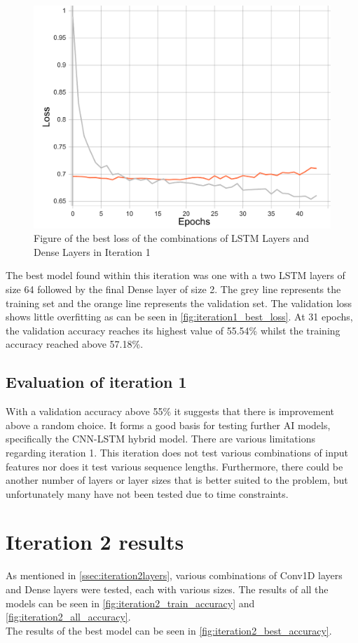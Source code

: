 \begin{figure}[ht]
    \centering
    \includegraphics[width=0.95\columnwidth]{figures/results/lstm/lstm_2L64-2D32_loss.pdf}
    \caption[Best loss for Iteration 1]{Figure of the best loss of the combinations of LSTM Layers and Dense Layers in Iteration 1}
    \label{fig:iteration1_best_loss}
\end{figure}
\FloatBarrier

The best model found within this iteration was one with a two LSTM layers of size 64 followed
by the final Dense layer of size 2. The grey line represents the training set and the orange line represents
the validation set. The validation loss shows little overfitting as can be seen in
\autoref{fig:iteration1_best_loss}. At 31 epochs, the validation accuracy reaches its highest value of
55.54\% whilst the training accuracy reached above 57.18\%.
\subsection{Evaluation of iteration 1}
With a validation accuracy above 55\% it suggests that there is improvement above a random choice. It forms a good
basis for testing further AI models, specifically the CNN-LSTM hybrid model.
There are various limitations regarding iteration 1. This iteration does not test various combinations of
input features nor does it test various sequence lengths. Furthermore, there could be another number of layers or
layer sizes that is better suited to the problem, but unfortunately many have not been tested due to time constraints.

\section{Iteration 2 results}\label{iteration2_results}
As mentioned in \autoref{ssec:iteration2layers}, various combinations of Conv1D layers and Dense layers were tested,
each with various sizes. The results of all the models can be seen in \autoref{fig:iteration2_train_accuracy}
and \autoref{fig:iteration2_all_accuracy}.\\
The results of the best model can be seen in \autoref{fig:iteration2_best_accuracy}.

